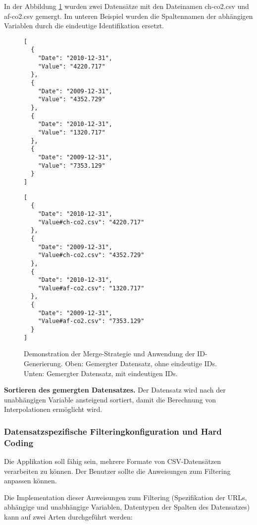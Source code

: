 In der Abbildung \ref{fig:merge} wurden zwei Datensätze mit den Dateinamen ch-co2.csv und af-co2.csv gemergt. Im unteren Beispiel wurden die Spaltennamen der abhängigen Variablen durch die eindeutige Identifikation ersetzt.

\begin{figure}[!htbp]
	\centering
	\begin{minipage}{0.40\textwidth}
		\centering
		\begin{verbatim}
[
  {
    "Date": "2010-12-31",
    "Value": "4220.717"
  },
  {
    "Date": "2009-12-31",
    "Value": "4352.729"
  },
  {
    "Date": "2010-12-31",
    "Value": "1320.717"
  },
  {
    "Date": "2009-12-31",
    "Value": "7353.129"
  }
]
		\end{verbatim}
	\end{minipage}\hfill
	\begin{minipage}{0.5\textwidth}
		\centering
		\begin{verbatim}
[
  {
    "Date": "2010-12-31",
    "Value#ch-co2.csv": "4220.717"
  },
  {
    "Date": "2009-12-31",
    "Value#ch-co2.csv": "4352.729"
  },
  {
    "Date": "2010-12-31",
    "Value#af-co2.csv": "1320.717"
  },
  {
    "Date": "2009-12-31",
    "Value#af-co2.csv": "7353.129"
  }
]
		\end{verbatim}
	\end{minipage}
	\caption[Merge-Strategie]{Demonstration der Merge-Strategie und Anwendung der ID-Generierung. Oben: Gemergter Datensatz, ohne eindeutige IDs. Unten: Gemergter Datensatz, mit eindeutigen IDs.}
	\label{fig:merge}
\end{figure}

\textbf{Sortieren des gemergten Datensatzes.} Der Datensatz wird nach der unabhängigen Variable ansteigend sortiert, damit die Berechnung von Interpolationen ermöglicht wird.

\subsubsection{Datensatzspezifische Filteringkonfiguration und Hard Coding}

Die Applikation soll fähig sein, mehrere Formate von CSV-Datensätzen verarbeiten zu können. Der Benutzer sollte die Anweisungen zum Filtering anpassen können.

Die Implementation dieser Anweisungen zum Filtering (Spezifikation der URLs, abhängige und unabhängige Variablen, Datentypen der Spalten des Datensatzes) kann auf zwei Arten durchgeführt werden:

